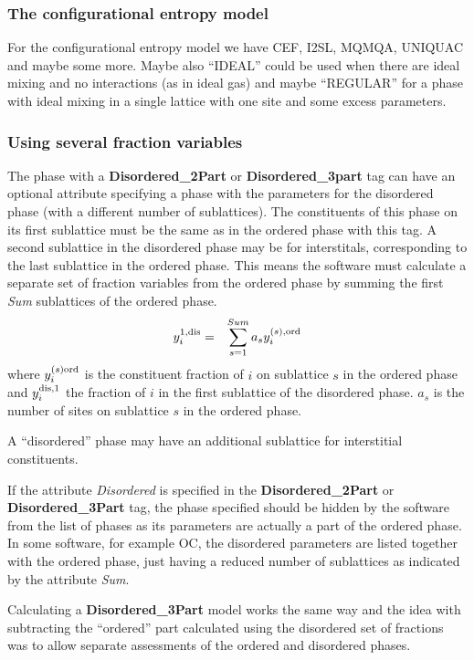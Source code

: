 \documentclass{article}
\begin{document}
\subsubsection{The configurational entropy model}\label{sec:cfg}

For the configurational entropy model we have CEF, I2SL, MQMQA,
UNIQUAC and maybe some more.  Maybe also ``IDEAL'' could be used when
there are ideal mixing and no interactions (as in ideal gas) and maybe
``REGULAR'' for a phase with ideal mixing in a single lattice with one
site and some excess parameters.

\subsubsection{Using several fraction variables}\label{sec:nodis}

The phase with a {\bf Disordered\_2Part} or {\bf Disordered\_3part}
tag can have an optional attribute specifying a phase with the
parameters for the disordered phase (with a different number of
sublattices). The constituents of this phase on its first sublattice
must be the same as in the ordered phase with this tag.  A second
sublattice in the disordered phase may be for interstitals,
corresponding to the last sublattice in the ordered phase.  This means
the software must calculate a separate set of fraction variables from
the ordered phase by summing the first {\em Sum} sublattices of the
ordered phase.
\begin{eqnarray}
y^{1,\rm dis}_i &=& \sum^{Sum}_{s=1} a_s y^{(s),\rm ord}_i
\end{eqnarray}
where $y^{(s)\rm ord}_i$ is the constituent fraction of $i$ on
sublattice $s$ in the ordered phase and $y^{\rm dis,1}_i$ the fraction
of $i$ in the first sublattice of the disordered phase.  $a_s$ is the
number of sites on sublattice $s$ in the ordered phase.

A ``disordered'' phase may have an additional sublattice for
interstitial constituents.

If the attribute {\em Disordered} is specified in the {\bf
  Disordered\_2Part} or {\bf Disordered\_3Part} tag, the phase
specified should be hidden by the software from the list of phases as
its parameters are actually a part of the ordered phase.  In some
software, for example OC, the disordered parameters are listed
together with the ordered phase, just having a reduced number of
sublattices as indicated by the attribute {\em Sum}.

Calculating a {\bf Disordered\_3Part} model works the same way and the
idea with subtracting the ``ordered'' part calculated using the
disordered set of fractions was to allow separate assessments of the
ordered and disordered phases.
\end{document}
